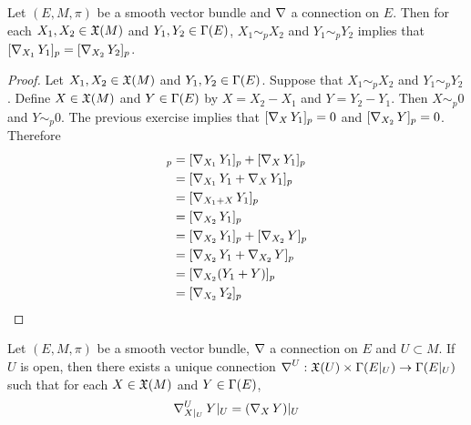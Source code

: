 \documentclass{book}
\begin{document}
	\begin{ex}
		Let $(E, M, \pi)$ be a smooth vector bundle and $\operatorname{\nabla}$ a connection on $E$. Then for each $X_1, X_2 \in \mathfrak{X}(M)$ and $Y_1, Y_2 \in \Gamma(E)$, $X_1 \sim_p X_2$ and $Y_1 \sim_p Y_2$ implies that $[\operatorname{\nabla}_{X_1}Y_1]_p = [\operatorname{\nabla}_{X_2}Y_2]_p $.
	\end{ex}

	\begin{proof}
		Let $X_1, X_2 \in \mathfrak{X}(M)$ and $Y_1, Y_2 \in \Gamma(E)$. Suppose that $X_1 \sim_p X_2$ and $Y_1 \sim_p Y_2$. Define $X \in \mathfrak{X}(M)$ and $Y \in \Gamma(E)$ by $X = X_2 - X_1$ and $Y = Y_2 - Y_1$. Then $X \sim_p 0$ and $Y \sim_p 0$. The previous exercise implies that $[\operatorname{\nabla}_{X}Y_1]_p = 0$ and $[\operatorname{\nabla}_{X_2} Y]_p = 0$. Therefore
		\begin{align*}
			[\nab_{X_1} Y_1]_p
			& = [\nab_{X_1} Y_1]_p + [\nab_X Y_1]_p \\
			& = [\nab_{X_1} Y_1 + \nab_X Y_1]_p \\
			& = [\nab_{X_1 + X} Y_1]_p \\
			& = [\nab_{X_2} Y_1]_p \\
			& = [\nab_{X_2} Y_1]_p + [\nab_{X_2} Y]_p \\
			& = [\nab_{X_2} Y_1 + \nab_{X_2} Y]_p \\
			& = [\nab_{X_2} (Y_1 + Y)]_p \\
			& = [\nab_{X_2} Y_2]_p \\
		\end{align*}
	\end{proof}

	\begin{ex}
		Let $(E, M, \pi)$ be a smooth vector bundle, $\operatorname{\nabla}$ a connection on $E$ and $U \subset M$. If $U$ is open, then there exists a unique connection $\operatorname{\nabla}^U: \mathfrak{X}(U) \times \Gamma(E|_U) \rightarrow \Gamma(E|_U)$ such that for each $X \in \mathfrak{X}(M)$ and $Y \in \Gamma(E)$, 
		$$\operatorname{\nabla}^U_{X|_U} Y|_U = (\operatorname{\nabla}_X Y)|_U$$
	\end{ex}

	

	
	
	
	
	
	
	
	
\end{document}
